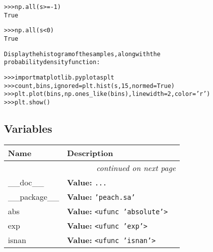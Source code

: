 \begin{boxedminipage}{\funcwidth}
\begin{alltt}
{\textgreater}{\textgreater}{\textgreater} np.all(s {\textgreater}= -1)
True

{\textgreater}{\textgreater}{\textgreater} np.all(s {\textless} 0)
True

Display the histogram of the samples, along with the
probability density function:

{\textgreater}{\textgreater}{\textgreater} import matplotlib.pyplot as plt
{\textgreater}{\textgreater}{\textgreater} count, bins, ignored = plt.hist(s, 15, normed=True)
{\textgreater}{\textgreater}{\textgreater} plt.plot(bins, np.ones\_like(bins), linewidth=2, color='r')
{\textgreater}{\textgreater}{\textgreater} plt.show()
\end{alltt}

\setlength{\parskip}{1ex}
    \end{boxedminipage}



  \subsection{Variables}

    \vspace{-1cm}
\hspace{\varindent}\begin{longtable}{|p{\varnamewidth}|p{\vardescrwidth}|l}
\cline{1-2}
\cline{1-2} \centering \textbf{Name} & \centering \textbf{Description}& \\
\cline{1-2}
\endhead\cline{1-2}\multicolumn{3}{r}{\small\textit{continued on next page}}\\\endfoot\cline{1-2}
\endlastfoot\raggedright \_\-\_\-d\-o\-c\-\_\-\_\- & \raggedright \textbf{Value:} 
{\tt \texttt{...}}&\\
\cline{1-2}
\raggedright \_\-\_\-p\-a\-c\-k\-a\-g\-e\-\_\-\_\- & \raggedright \textbf{Value:} 
{\tt \texttt{'}\texttt{peach.sa}\texttt{'}}&\\
\cline{1-2}
\raggedright a\-b\-s\- & \raggedright \textbf{Value:} 
{\tt {\textless}ufunc 'absolute'{\textgreater}}&\\
\cline{1-2}
\raggedright e\-x\-p\- & \raggedright \textbf{Value:} 
{\tt {\textless}ufunc 'exp'{\textgreater}}&\\
\cline{1-2}
\raggedright i\-s\-n\-a\-n\- & \raggedright \textbf{Value:} 
{\tt {\textless}ufunc 'isnan'{\textgreater}}&\\
\cline{1-2}
\end{longtable}

